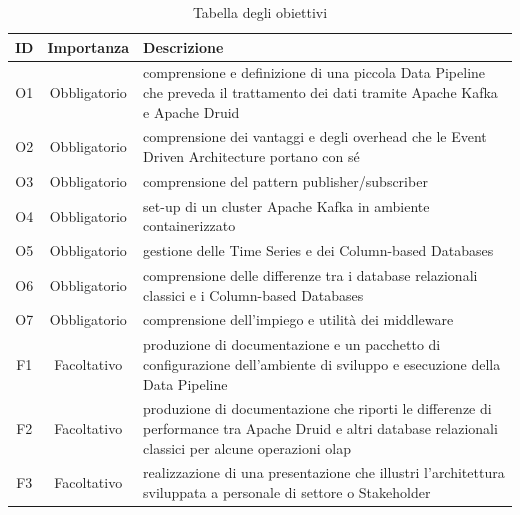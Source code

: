  \begin{table}[htbp]
    \centering
    \caption{Tabella degli obiettivi}    
    \label{tab:Tabella1}
    \begin{tabularx}{\textwidth}{|c|c|X|}
        \hline
        \textbf{ID} & \textbf{Importanza} & \textbf{Descrizione} \\\hline
        O1 & Obbligatorio & comprensione e definizione di una piccola \gls{Data Pipeline}{}  che  preveda il trattamento dei dati
        tramite Apache Kafka e Apache Druid \\\hline
        O2 & Obbligatorio & comprensione dei vantaggi e degli overhead  che le Event Driven Architecture portano con
        sé\\\hline
        O3 & Obbligatorio & comprensione del pattern publisher/subscriber \\\hline
        O4 & Obbligatorio & set-up di un cluster Apache Kafka in ambiente  containerizzato \\\hline
        O5 & Obbligatorio & gestione delle Time Series e dei Column-based Databases \\\hline
        O6 & Obbligatorio & comprensione delle differenze tra i database relazionali  classici e i Column-based Databases\\\hline
        O7 & Obbligatorio &comprensione dell’impiego e utilità dei middleware \\\hline
        F1 & Facoltativo & produzione di documentazione e un pacchetto di configurazione  dell’ambiente di sviluppo e
        esecuzione  della \gls{Data Pipeline}{}\\\hline
        F2 & Facoltativo & produzione di documentazione che riporti  le differenze  di performance  tra Apache Druid e altri
         database relazionali classici per alcune  operazioni \gls{olap}{} \\\hline
        F3 & Facoltativo & realizzazione di una presentazione che illustri l’architettura  sviluppata  a personale di settore o
        Stakeholder \\\hline
    \end{tabularx} 

\end{table}

\pagebreak

\pagebreak
